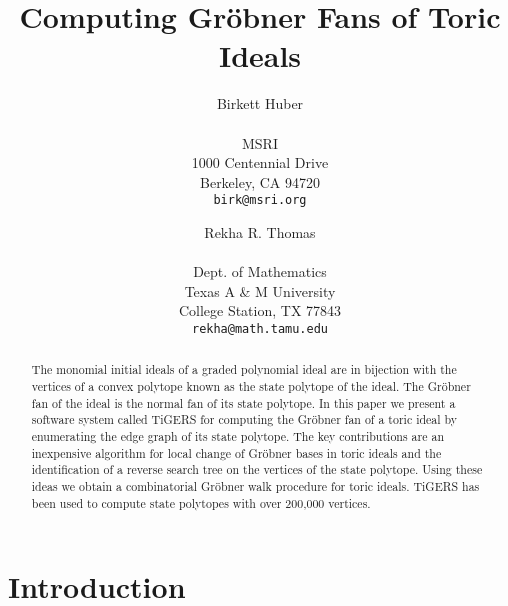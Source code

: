 \documentclass[11pt]{article}
\begin{document}
\newtheorem{lemma}{Lemma}[subsection]
\newtheorem{theorem}[lemma]{Theorem}
\newtheorem{definition}[lemma]{Definition}
\newtheorem{observation}[lemma]{Observation}
\newtheorem{remark}[lemma]{Remark}
\newtheorem{corollary}[lemma]{Corollary}
\newtheorem{proposition}[lemma]{Proposition}
\newtheorem{example}[lemma]{Example}
\newtheorem{algorithm}[lemma]{Algorithm}

\title{\bf Computing Gr\"obner Fans of Toric Ideals}
\author{Birkett Huber \\ \\
MSRI\\
1000 Centennial Drive\\
Berkeley, CA 94720\\
{\tt birk@msri.org} \and
Rekha R. Thomas\\ \\
Dept. of Mathematics\\
Texas A \& M University\\
College Station, TX 77843\\
{\tt rekha@math.tamu.edu}}
\maketitle

\begin{abstract}
The monomial initial ideals of a graded
polynomial ideal are in bijection with the vertices of a convex
polytope known as the state polytope of the ideal. The Gr\"obner fan
of the ideal is the normal fan of its state polytope. 
In this paper we present a software system called TiGERS for computing 
the Gr\"obner fan of a toric ideal by enumerating the edge graph of 
its state polytope. The key contributions are an inexpensive algorithm 
for local change of Gr\"obner bases in toric ideals and the 
identification of a reverse search tree on the vertices of the state 
polytope. Using these ideas we obtain a combinatorial Gr\"obner walk
procedure for toric ideals. TiGERS has been used to compute state
polytopes with over 200,000 vertices.  
\end{abstract}

\section{Introduction} 
\end{document}
